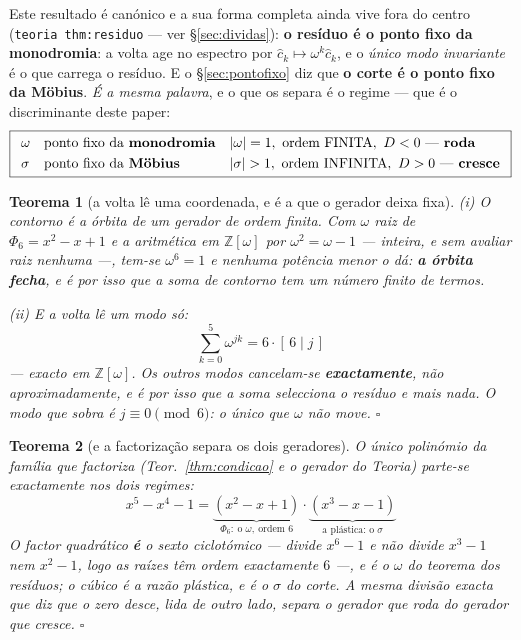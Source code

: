 \documentclass[11pt,a4paper]{article}
\newtheorem{teorema}{Teorema}
\newcommand{\code}[1]{\texttt{\small #1}}
\newcommand{\abs}[1]{\lvert #1\rvert}
\begin{document}
\noindent Este resultado é canónico e a sua forma completa ainda vive fora do centro (\code{teoria thm:residuo} --- ver \S\ref{sec:dividas}): \textbf{o resíduo é
o ponto fixo da monodromia}: a volta age no espectro por
$\hat c_k\mapsto\omega^{k}\hat c_k$, e o \emph{único modo invariante} é o que carrega
o resíduo. E o \S\ref{sec:pontofixo} diz que \textbf{o corte é o ponto fixo da
Möbius}. \emph{É a mesma palavra}, e o que os separa é o regime --- que é o
discriminante deste paper:
\[
\boxed{
\begin{array}{lll}
\omega & \text{ponto fixo da \textbf{monodromia}} & \abs{\omega}=1,\ \text{ordem
FINITA},\ D<0\ \text{--- \textbf{roda}}\\[3pt]
\sigma & \text{ponto fixo da \textbf{Möbius}} & \abs{\sigma}>1,\ \text{ordem
INFINITA},\ D>0\ \text{--- \textbf{cresce}}
\end{array}}
\]

\begin{teorema}[a volta lê uma coordenada, e é a que o gerador deixa fixa]\label{thm:residuo-geo}
\emph{(i) O contorno é a órbita de um gerador de ordem finita.} Com
$\omega$ raiz de $\Phi_6=x^{2}-x+1$ e a aritmética em $\mathbb{Z}[\omega]$ por
$\omega^{2}=\omega-1$ --- \emph{inteira, e sem avaliar raiz nenhuma} ---, tem-se
$\omega^{6}=1$ e nenhuma potência menor o dá: \textbf{a órbita fecha}, e é por isso
que a soma de contorno tem um número finito de termos.

\emph{(ii) E a volta lê um modo só:}
\[
\boxed{\;\sum_{k=0}^{5}\omega^{jk}=6\cdot[\,6\mid j\,]\;}
\]
--- exacto em $\mathbb{Z}[\omega]$. Os outros modos cancelam-se
\textbf{exactamente}, não aproximadamente, e é por isso que a soma selecciona o
resíduo e mais nada. O modo que sobra é $j\equiv0\pmod 6$: \emph{o único que
$\omega$ não move}. $\square$
\end{teorema}

\begin{teorema}[e a factorização separa os dois geradores]\label{thm:separa}
O único polinómio da família que factoriza (Teor.~\ref{thm:condicao} e o
\emph{gerador} do \emph{Teoria}) parte-se exactamente nos dois regimes:
\[
\boxed{\;x^{5}-x^{4}-1=\underbrace{(x^{2}-x+1)}_{\Phi_6:\ \text{o }\omega,\ \text{ordem }6}
\cdot\underbrace{(x^{3}-x-1)}_{\text{a plástica: o }\sigma}\;}
\]
O factor quadrático \textbf{é} o sexto ciclotómico --- divide $x^{6}-1$ e \emph{não}
divide $x^{3}-1$ nem $x^{2}-1$, logo as raízes têm ordem exactamente $6$ ---, e é o
$\omega$ do teorema dos resíduos; o cúbico é a razão plástica, e é o $\sigma$ do
corte. \emph{A mesma divisão exacta que diz que o zero desce, lida de outro lado,
separa o gerador que roda do gerador que cresce.} $\square$
\end{teorema}
\end{document}
